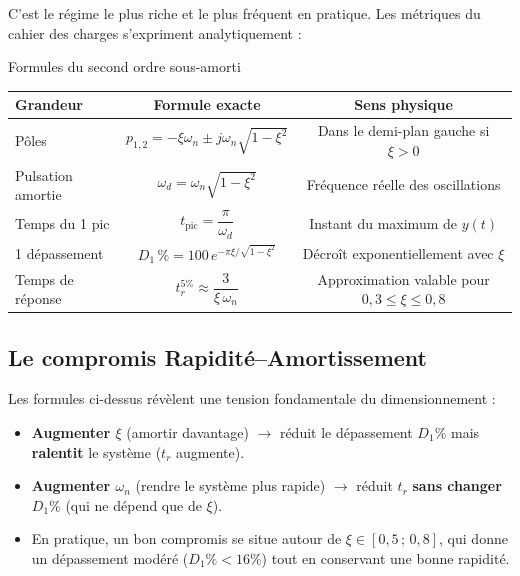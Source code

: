 \documentclass[11pt,a4paper]{report}
\begin{document}
C'est le régime le plus riche et le plus fréquent en pratique. Les métriques du cahier des charges s'expriment analytiquement :

\begin{importantbox}{Formules du second ordre sous-amorti}
\renewcommand{\arraystretch}{1.6}
\begin{center}
\small
\begin{tabular}{|l|c|c|}
\hline
\textbf{Grandeur} & \textbf{Formule exacte} & \textbf{Sens physique} \\ \hline
Pôles & $p_{1,2} = -\xi\omega_n \pm j\omega_n\sqrt{1-\xi^2}$ & Dans le demi-plan gauche si $\xi > 0$ \\ \hline
Pulsation amortie & $\omega_d = \omega_n\sqrt{1-\xi^2}$ & Fréquence réelle des oscillations \\ \hline
Temps du 1\ier{} pic & $t_{\text{pic}} = \dfrac{\pi}{\omega_d}$ & Instant du maximum de $y(t)$ \\ \hline
1\ier{} dépassement & $D_1\,\% = 100\,e^{-\pi\xi/\sqrt{1-\xi^2}}$ & Décroît exponentiellement avec $\xi$ \\ \hline
Temps de réponse & $t_r^{5\%} \approx \dfrac{3}{\xi\,\omega_n}$ & Approximation valable pour $0{,}3 \le \xi \le 0{,}8$ \\ \hline
\end{tabular}
\end{center}
\renewcommand{\arraystretch}{1}
\end{importantbox}

\subsection{Le compromis Rapidité–Amortissement}

Les formules ci-dessus révèlent une tension fondamentale du dimensionnement :

\begin{itemize}
  \item \textbf{Augmenter $\xi$} (amortir davantage) $\longrightarrow$ réduit le dépassement $D_1\%$ mais \textbf{ralentit} le système ($t_r$ augmente).
  \item \textbf{Augmenter $\omega_n$} (rendre le système plus rapide) $\longrightarrow$ réduit $t_r$ \textbf{sans changer} $D_1\%$ (qui ne dépend que de $\xi$).
  \item En pratique, un bon compromis se situe autour de $\xi \in [0{,}5\,;\,0{,}8]$, qui donne un dépassement modéré ($D_1\% < 16\%$) tout en conservant une bonne rapidité.
\end{itemize}
\end{document}
